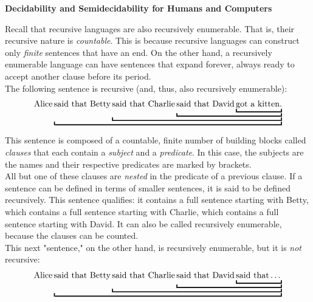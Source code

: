 \begin{tcolorbox}[breakable, enhanced, colback=textbook-blue, sharp corners]
	\vspace{2mm}
	\begin{center}
		\textbf{Decidability and Semidecidability for Humans and Computers}
	\end{center}
	\vspace{1mm}
	Recall that recursive languages are also recursively enumerable. That is, their recursive nature is \textit{countable}. This is because recursive languages can construct only \textit{finite} sentences that have an end. On the other hand, a recursively enumerable language can have sentences that expand forever, always ready to accept another clause before its period. \\
	
	The following sentence is recursive (and, thus, also recursively enumerable): 
	\begin{align*}
		\textnormal{Alice} 
		\underbracket{\textnormal{said that Betty}
		\underbracket{\textnormal{said that Charlie}
		\underbracket{\textnormal{said that David}
		\underbracket{\textnormal{got a kitten.}}}}}
	\end{align*}
	\vspace{1mm}
	
	This sentence is composed of a countable, finite number of building blocks called \textit{clauses} that each contain a \textit{subject} and a \textit{predicate}. In this case, the subjects are the names and their respective predicates are marked by brackets. \\
	
	All but one of these clauses are \textit{nested} in the predicate of a previous clause. If a sentence can be defined in terms of smaller sentences, it is said to be defined recursively. This sentence qualifies: it contains a full sentence starting with Betty, which contains a full sentence starting with Charlie, which contains a full sentence starting with David. It can also be called recursively enumerable, because the clauses can be counted. \\
	
	This next "sentence," on the other hand, is recursively enumerable, but it is \textit{not} recursive:
	\begin{align*}
	\textnormal{Alice} 
	\underbracket{\textnormal{said that Betty}
		\underbracket{\textnormal{said that Charlie}
			\underbracket{\textnormal{said that David}
				\underbracket{\textnormal{said that}\dots\vphantom{\textnormal{g}}}}}}
	\end{align*}
	\vspace{1mm}
	

\end{tcolorbox}
